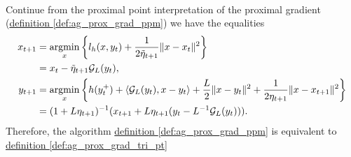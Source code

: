 \documentclass[12pt]{article}
\begin{document}
            \begin{proposition}
            \label{prop:derive_ag_prox_grad_tript}
                \quad \\
                Continue from the proximal point interpretation of the proximal gradient 
                (\hyperref[def:ag_prox_grad_ppm]{definition \ref*{def:ag_prox_grad_ppm}})
                we have the equalities 
                \begin{align*}
                    x_{t + 1} &= \mathop{\rm argmin}\limits_{x}
                    \left\lbrace
                        l_h(x, y_t) + \frac{1}{2\tilde \eta_{t + 1}} \Vert x - x_t\Vert^2
                    \right\rbrace
                    \\
                    &= x_t - \tilde\eta_{t + 1} \mathcal G_L(y_t), 
                    \\
                    y_{t + 1} &= \mathop{\rm argmin}\limits_{x}
                    \left\lbrace
                          h(y_t^+) + \langle \mathcal G_L(y_t), x - y_t\rangle + \frac{L}{2}\Vert x -y_t\Vert^2 + \frac{1}{2\eta_{t + 1}}\Vert x - x_{t + 1}\Vert^2
                    \right\rbrace
                    \\
                    &= (1 + L\eta_{t + 1})^{-1}
                    (x_{t + 1} + L\eta_{t + 1}(y_t - L^{-1}\mathcal  G_L(y_t))). 
                \end{align*}
                Therefore, the algorithm 
                \hyperref[def:ag_prox_grad_ppm]{definition \ref*{def:ag_prox_grad_ppm}}
                is equivalent to 
                \hyperref[def:ag_prox_grad_tri_pt]{definition \ref*{def:ag_prox_grad_tri_pt}}
            \end{proposition}
\end{document}
